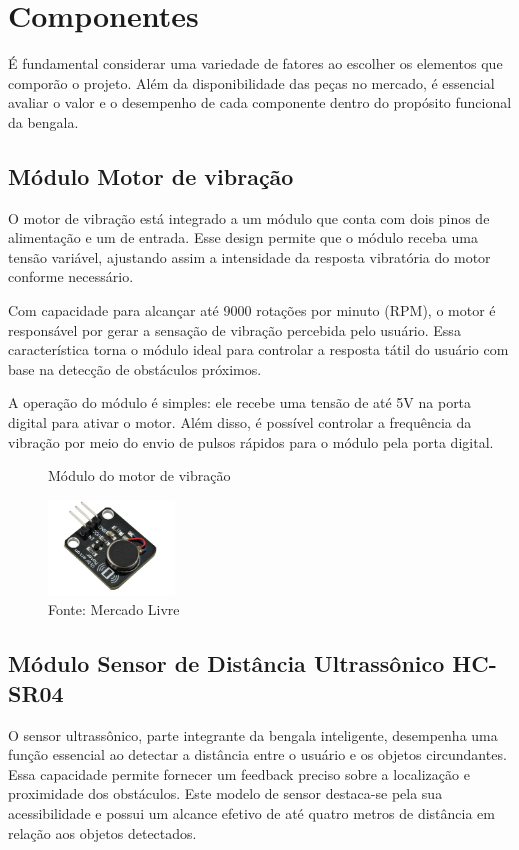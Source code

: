     \section{Componentes}
    É fundamental considerar uma variedade de fatores ao escolher os elementos que comporão o projeto. Além da disponibilidade das peças no mercado, é essencial avaliar o valor e o desempenho de cada componente dentro do propósito funcional da bengala. 

    \subsection{Módulo Motor de vibração}
    O motor de vibração está integrado a um módulo que conta com dois pinos de alimentação e um de entrada. Esse design permite que o módulo receba uma tensão variável, ajustando assim a intensidade da resposta vibratória do motor conforme necessário.

    Com capacidade para alcançar até 9000 rotações por minuto (RPM), o motor é responsável por gerar a sensação de vibração percebida pelo usuário. Essa característica torna o módulo ideal para controlar a resposta tátil do usuário com base na detecção de obstáculos próximos.
    
    A operação do módulo é simples: ele recebe uma tensão de até 5V na porta digital para ativar o motor. Além disso, é possível controlar a frequência da vibração por meio do envio de pulsos rápidos para o módulo pela porta digital.
    
     \begin{figure}[h!]
        \captionsetup{width=1\textwidth}
        \caption{\label{fig:motorvibracao} Módulo do motor de vibração}
        \centering
        \includegraphics[width=0.3\textwidth]{figuras/motorvibracao} 
        \caption*{Fonte: Mercado Livre}
    \end{figure}

    \subsection{Módulo Sensor de Distância Ultrassônico HC-SR04}

    O sensor ultrassônico, parte integrante da bengala inteligente, desempenha uma função essencial ao detectar a distância entre o usuário e os objetos circundantes. Essa capacidade permite fornecer um feedback preciso sobre a localização e proximidade dos obstáculos. Este modelo de sensor destaca-se pela sua acessibilidade e possui um alcance efetivo de até quatro metros de distância em relação aos objetos detectados.

